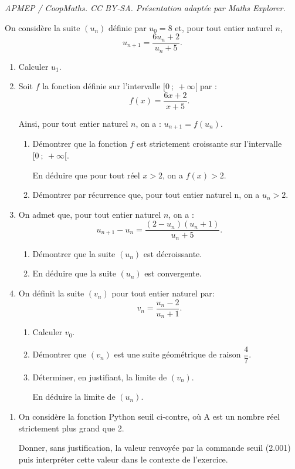 \documentclass[10pt]{article}
\begin{document}
\noindent\textit{APMEP / CoopMaths. CC BY-SA. Présentation adaptée par Maths Explorer.}\par\medskip
\medskip

On considère la suite $\left(u_n\right)$ définie par $u_0 = 8$ et, pour tout entier naturel $n$,
\[u_{n +1} = \dfrac{6u_n + 2}{u_n +5}.\]

\smallskip

\begin{enumerate}
\item Calculer $u_1$.
\item Soit $f$ la fonction définie sur l'intervalle $[0~;~+\infty[$ par :
\[f(x) = \dfrac{6x + 2 }{x +5}.\]

Ainsi, pour tout entier naturel $n$, on a : $u_{n+1} = f\left(u_n\right)$.
	\begin{enumerate}
		\item Démontrer que la fonction $f$ est strictement croissante sur l'intervalle $[0~;~+\infty[$.
		
En déduire que pour tout réel $x > 2$, on a $f(x) > 2$.
		\item Démontrer par récurrence que, pour tout entier naturel n, on a $u_n > 2$.
	\end{enumerate}
\item On admet que, pour tout entier naturel $n$, on a :
\[u_{n+1} - u_n = \dfrac{\left(2 - u_n\right)\left(u_n + 1\right)}{u_n +5}.\]

	\begin{enumerate}
		\item Démontrer que la suite $\left(u_n\right)$ est décroissante.
		\item En déduire que la suite $\left(u_n\right)$ est convergente.
	\end{enumerate}
\item On définit la suite $\left(v_n\right)$ pour tout entier naturel par:
\[v_n = \dfrac{u_n - 2}{u_n + 1}.\]

	\begin{enumerate}
		\item Calculer $v_0$.
		\item Démontrer que $\left(v_n\right)$ est une suite géométrique de raison $\dfrac47$.
		\item Déterminer, en justifiant, la limite de $\left(v_n\right)$.
		
En déduire la limite de $\left(u_n\right)$.
	\end{enumerate}
\end{enumerate}
\begin{minipage}{0.53\linewidth}
\begin{enumerate}[resume]
		\item  On considère la fonction
Python seuil ci-contre, où A est un nombre réel strictement plus grand que 2.

Donner, sans justification, la valeur renvoyée par la commande seuil (2.001) puis interpréter cette valeur dans le contexte de l'exercice.
\end{enumerate}
\end{minipage}\hfill
\end{document}
